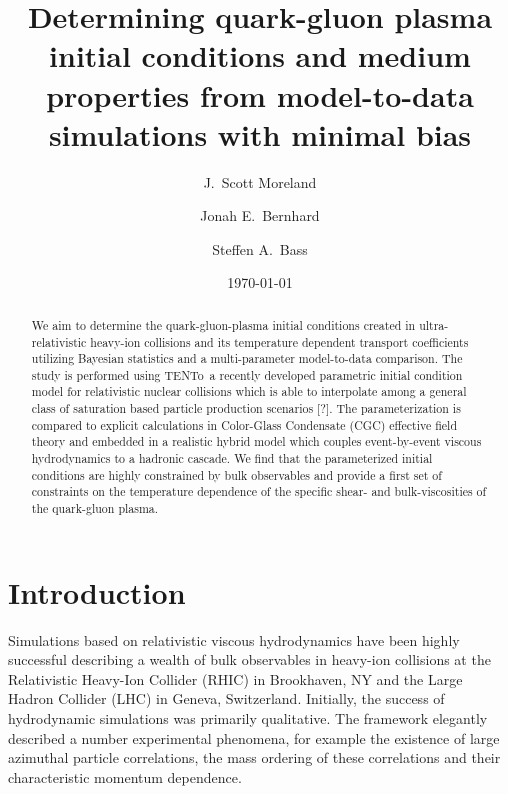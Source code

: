 \documentclass[aps,prc,reprint,amsmath]{revtex4-1}
\newcommand{\trento}{T\raisebox{-0.5ex}{R}ENTo}
\begin{document}
\title{Determining quark-gluon plasma initial conditions and medium \\ properties from model-to-data simulations with minimal bias}

\author{J.\ Scott Moreland}
\author{Jonah E.\ Bernhard}
\author{Steffen A.\ Bass}

\date{\today}


\begin{abstract}
We aim to determine the quark-gluon-plasma initial conditions created in ultra-relativistic heavy-ion collisions and its temperature dependent transport coefficients utilizing Bayesian statistics and a multi-parameter model-to-data comparison.
The study is performed using \trento\ a recently developed parametric initial condition model for relativistic nuclear collisions which is able to interpolate among a general class of saturation based particle production scenarios [?].
The parameterization is compared to explicit calculations in Color-Glass Condensate (CGC) effective field theory and embedded in a realistic hybrid model which couples event-by-event viscous hydrodynamics to a hadronic cascade.
We find that the parameterized initial conditions are highly constrained by bulk observables and provide a first set of constraints on the temperature dependence of the specific shear- and bulk-viscosities of the quark-gluon plasma.
\end{abstract}


\maketitle


\section{Introduction}

Simulations based on relativistic viscous hydrodynamics have been highly successful describing a wealth of bulk observables in heavy-ion collisions at the Relativistic Heavy-Ion Collider (RHIC) in Brookhaven, NY and the Large Hadron Collider (LHC) in Geneva, Switzerland. Initially, the success of hydrodynamic simulations was primarily qualitative. The framework elegantly described a number experimental phenomena, for example the existence of large azimuthal particle correlations, the mass ordering of these correlations and their characteristic momentum dependence.
\end{document}
